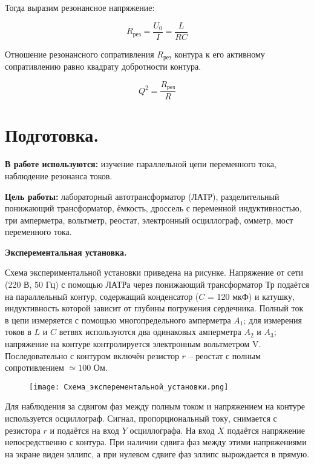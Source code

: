     Тогда выразим резонансное напряжение:

    \begin{equation*}
        R_{\text{рез}} = \frac{U_0}{I} = \frac{L}{R C}
    \end{equation*}

    \noindent Отношение резонансного сопративления $R_{\text{рез}}$ контура
    к его активному сопративлению равно квадрату добротности контура.

    \begin{equation*}
        Q^2 = \frac{R_{\text{рез}}}{R}
    \end{equation*}

    \section*{Подготовка.}

    \noindent \textbf{В работе используются:} изучение параллельной цепи переменного тока, наблюдение резонанса токов.
	
	\noindent \textbf{Цель работы:} лабораторный автотрансформатор (ЛАТР),
    разделительный понижающий трансформатор, ёмкость, дроссель с переменной индуктивностью, три амперметра, вольтметр, реостат, электронный осциллограф, омметр, мост переменного тока.
	
    \hfill

    \noindent \textbf{Эксперементальная установка.}

    \noindent Схема экспериментальной установки
    приведена на рисунке. Напряжение от сети (220 В, 50 Гц) с помощью ЛАТРа через понижающий трансформатор Тр подаётся на параллельный
    контур, содержащий конденсатор ($C$ = 120 мкФ) и катушку, индуктивность которой зависит от глубины погружения сердечника. Полный ток
    в цепи измеряется с помощью многопредельного амперметра $A_1$; для измерения токов в $L$ и $C$ ветвях используются два одинаковых амперметра
    $A_2$ и $A_3$; напряжение на контуре контролируется электронным вольтметром V. Последовательно с контуром включён резистор $r$ -- реостат с полным сопротивлением $\simeq 100$ Ом.

    \begin{figure}[h!]
        \centering
        \texttt{[image: Схема\_эксперементальной\_установки.png]}
        \caption{}
    \end{figure}

    \hfill

    \noindent Для наблюдения за сдвигом фаз между полным током и напряжением
    на контуре используется осциллограф. Сигнал, пропорциональный току,
    снимается с резистора $r$ и подаётся на вход $Y$ осциллографа. На вход $X$
    подаётся напряжение непосредственно с контура. При наличии сдвига
    фаз между этими напряжениями на экране виден эллипс, а при нулевом
    сдвиге фаз эллипс вырождается в прямую.
